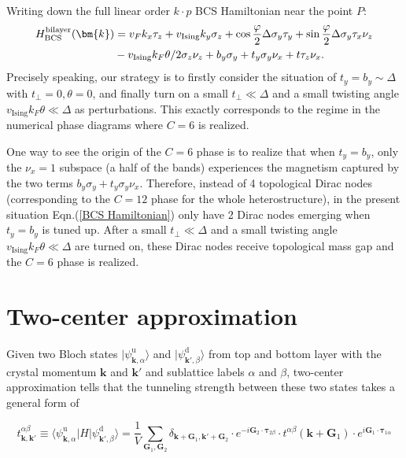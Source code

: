 \begin{subappendices}
	    Writing down the full linear order $k \cdot p$ BCS Hamiltonian near the point $P$:
	    \begin{align}
					H_{\text{BCS}}^{\text{bilayer}}(\bm{k})&=v_F k_x\tau_z+v_{\text{Ising}} k_y\sigma_z+\cos\frac{\varphi}{2} \Delta \sigma_y\tau_y+\sin\frac{\varphi}{2}\Delta\sigma_y\tau_x\nu_z\notag\\
					&-v_{\text{Ising}} k_F\theta/2 \sigma_z\nu_z+b_y\sigma_y+t_y\sigma_y\nu_x+t\tau_z\nu_x.\label{BCS Hamiltonian}
		\end{align}
		Precisely speaking, our strategy is to firstly consider the situation of $t_y=b_y\sim \Delta$ with $t_\perp=0,\theta=0$, and finally turn on a small $t_\perp\ll\Delta$ and a small twisting angle $v_{\text{Ising}}k_F\theta\ll \Delta$ as perturbations. This exactly corresponds to the regime in the numerical phase diagrams where $C=6$ is realized.
		
		One way to see the origin of the $C=6$ phase is to realize that when $t_y=b_y$, only the $\nu_x=1$ subspace (a half of the bands) experiences the magnetism captured by the two terms $b_y\sigma_y+t_y\sigma_y\nu_x$. Therefore, instead of 4 topological Dirac nodes (corresponding to the $C=12$ phase for the whole heterostructure), in the present situation Eqn.(\ref{BCS Hamiltonian}) only have 2 Dirac nodes emerging when $t_y=b_y$ is tuned up. After a small $t_\perp\ll\Delta$ and a small twisting angle $v_{\text{Ising}}k_F\theta\ll \Delta$ are turned on, these Dirac nodes receive topological mass gap and the $C=6$ phase is realized.
		
	
\section{Two-center approximation}
	Given two Bloch states $|\psi^\text{u}_{\bm{k},\alpha}\rangle$ and $|\psi^\text{d}_{\bm{k'},\beta}\rangle$ from top and bottom layer with the crystal momentum $\bm{k}$ and $\bm{k'}$ and sublattice labels $\alpha$ and $\beta$, two-center approximation \cite{bistritzer2011moire} tells that the tunneling strength between these two states takes a general form of \cite{catarina2019twisted}
	
		\begin{equation}\label{general tunneling}
			t^{\alpha\beta}_{\bm{k},\bm{k'}}\equiv\langle\psi^\text{u}_{\bm{k},\alpha}|H|\psi^\text{d}_{\bm{k'},\beta}\rangle=\dfrac{1}{V}\sum_{\bm{G}_1,\bm{G}_2}\delta_{\bm{k}+\bm{G}_1,\bm{k'}+\bm{G}_2}\cdot e^{-i\bm{G}_2\cdot\bm{\tau}_{2\beta}}\cdot t^{\alpha\beta}(\bm{k}+\bm{G}_1)\cdot e^{i\bm{G}_1\cdot\bm{\tau}_{1 \alpha}}
		\end{equation}
	

\end{subappendices}
